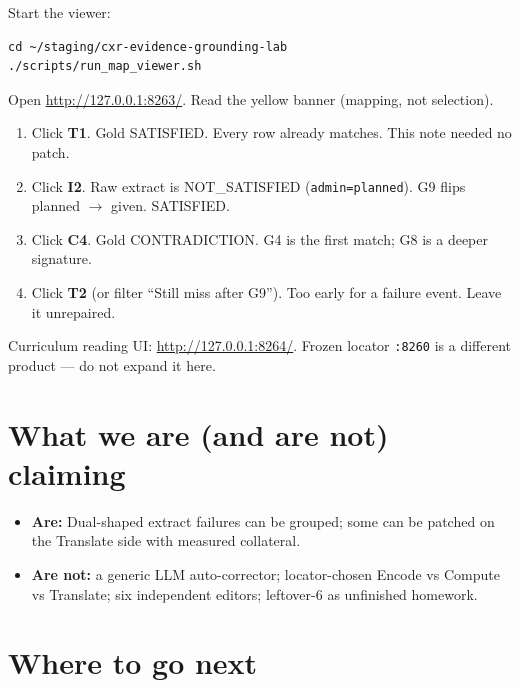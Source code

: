 \documentclass[11pt,a4paper]{article}
\begin{document}
Start the viewer:

\begin{verbatim}
cd ~/staging/cxr-evidence-grounding-lab
./scripts/run_map_viewer.sh
\end{verbatim}

Open \url{http://127.0.0.1:8263/}. Read the yellow banner (mapping, not selection).

\begin{enumerate}
  \item Click \textbf{T1}. Gold SATISFIED. Every row already matches. This note needed no patch.
  \item Click \textbf{I2}. Raw extract is NOT\_SATISFIED (\texttt{admin=planned}). G9 flips planned $\rightarrow$ given. SATISFIED.
  \item Click \textbf{C4}. Gold CONTRADICTION. G4 is the first match; G8 is a deeper signature.
  \item Click \textbf{T2} (or filter ``Still miss after G9''). Too early for a failure event. Leave it unrepaired.
\end{enumerate}

Curriculum reading UI: \url{http://127.0.0.1:8264/}. Frozen locator \texttt{:8260} is a different product --- do not expand it here.

\section{What we are (and are not) claiming}

\begin{itemize}
  \item \textbf{Are:} Dual-shaped extract failures can be grouped; some can be patched on the Translate side with measured collateral.
  \item \textbf{Are not:} a generic LLM auto-corrector; locator-chosen Encode vs Compute vs Translate; six independent editors; leftover-6 as unfinished homework.
\end{itemize}

\section{Where to go next}
\end{document}
